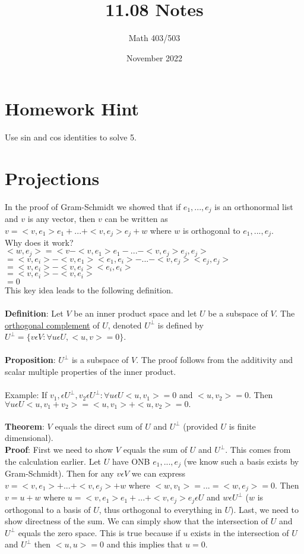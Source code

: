 \documentclass{article}
\title{11.08 Notes}
\author{Math 403/503}
\date{November 2022}
\begin{document}
\maketitle

\section{Homework Hint}
Use sin and cos identities to solve 5. 
\section{Projections}
In the proof of Gram-Schmidt we showed that if $e_1, ..., e_j$ is an orthonormal list and $v$ is any vector, then $v$ can be written as $v = <v, e_1>e_1 + ... + <v,e_j>e_j + w$ where $w$ is orthogonal to $e_1, ..., e_j$.\\
Why does it work? \\
$<w,e_j> = < v - <v, e_1>e_1 - ... - <v, e_j>e_j, e_j>$\\
$=<v,e_i> - <v,e_1><e_1,e_i>-...-<v,e_j><e_j,e_j>$\\
$=<v,e_i> - <v,e_i><e_i, e_i>$\\
$=<v,e_i> - <v, e_i>$\\
$=0$ \\
This key idea leads to the following definition. \\\\
\textbf{Definition}: Let $V$ be an inner product space and let $U$ be a subspace of $V$. The \underline{orthogonal complement} of $U$, denoted $U^\perp$ is defined by $ U^\perp =\{v \epsilon V: \forall u \epsilon U, <u,v> = 0\}$. \\\\
\textbf{Proposition}: $U^{\perp}$ is a subspace of $V$. The proof follows from the additivity and scalar multiple properties of the inner product. \\\\
Example: If $v_1, \epsilon U^\perp, v_2 \epsilon U^\perp : \forall u \epsilon U <u, v_1> = 0$ and $<u, v_2> = 0$. Then $ \forall u \epsilon U <u, v_1 + v_2> = <u, v_1> + <u,v_2> = 0.$ \\\\
\textbf{Theorem}: $V$ equals the direct sum of $U$ and $U^{\perp}$ (provided $U$ is finite dimensional). \\
\textbf{Proof}: First we need to show $V$ equals the sum of $U$ and $U^{\perp}$. This comes from the calculation earlier. Let $U$ have ONB $e_1, ..., e_j$ (we know such a basis exists by Gram-Schmidt). Then for any $v \epsilon V$ we can express $v = <v, e_1> + ... + <v, e_j> + w$ where $<w,v_1> = ... = <w, e_j> = 0$. Then $v = u + w$ where $u = <v, e_1>e_1 + ... +<v,e_j>e_j \epsilon U$ and $w \epsilon U^{\perp}$ ($w$ is orthogonal to a basis of $U$, thus orthogonal to everything in $U$). Last, we need to show directness of the sum. We can simply show that the intersection of $U$ and $U^\perp$ equals the zero space. This is true because if $u$ exists in the intersection of $U$ and $U^{\perp}$ then $<u,u> = 0$ and this implies that $u = 0$. \\\\
\end{document}
